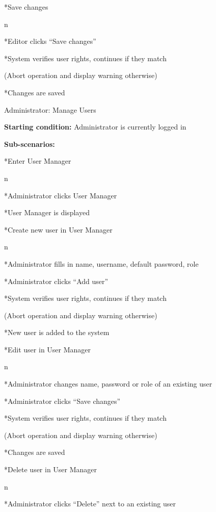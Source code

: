 \enditems

*Save changes

\begitems \style n

*Editor clicks “Save changes”

*System verifies user rights, continues if they match

(Abort operation and display warning otherwise)

*Changes are saved

\enditems

\enditems

\secc Administrator: Manage Users

{\bf Starting condition:} Administrator is currently logged in

{\bf Sub-scenarios:}

\begitems

*Enter User Manager

\begitems \style n

*Administrator clicks User Manager

*User Manager is displayed

\enditems

*Create new user in User Manager

\begitems \style n

*Administrator fills in name, username, default password, role

*Administrator clicks “Add user”

*System verifies user rights, continues if they match

(Abort operation and display warning otherwise)

*New user is added to the system

\enditems

*Edit user in User Manager

\begitems \style n

*Administrator changes name, password or role of an existing user

*Administrator clicks “Save changes”

*System verifies user rights, continues if they match

(Abort operation and display warning otherwise)

*Changes are saved

\enditems

*Delete user in User Manager

\begitems \style n

*Administrator clicks “Delete” next to an existing user

